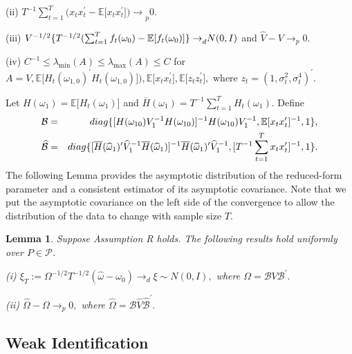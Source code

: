 \documentclass[11pt]{article}
\newtheorem{lemma}{Lemma}[section]
\begin{document}
\noindent (ii) $T^{-1}\sum_{t=1}^{T}(x_{t}x_{t}^{\prime }-\mathbb{E[}%
x_{t}x_{t}^{\prime }\mathbb{])\rightarrow }_{p}0.$

\noindent (iii) $V^{-1/2}\{T^{-1/2}(\sum_{t=1}^{T}f_{t}(\omega _{0})-\mathbb{%
E[}f_{t}(\omega _{0})\mathbb{]\} \rightarrow }_{d}N(0,I)$ and $\widehat{V}%
-V\rightarrow _{p}0.$

\noindent (iv) $C^{-1}\leq \lambda _{\min }(A)\leq \lambda _{\max }(A)\leq C$
for $A=V,\mathbb{E[}H_{t}\left( \omega _{1,0}\right) ^{\prime }H_{t}\left(
\omega _{1,0}\right) ]),\mathbb{E[}x_{t}x_{t}^{\prime }],\mathbb{E[}%
z_{t}z_{t}^{\prime }],$ where $z_{t}=(1,\sigma _{t}^{2},\sigma
_{t}^{4})^{\prime }.$

\smallskip

Let $H(\omega _{1})=\mathbb{E[}H_{t}(\omega _{1})]$ and $\overline{H}(\omega
_{1})=T^{-1}\sum_{t=1}^{T}H_{t}(\omega _{1}).$ Define%
\begin{eqnarray}
\mathcal{B} &=&diag\{[H(\omega _{10})V_{1}^{-1}H(\omega _{10})]^{-1}H(\omega
_{10})V_{1}^{-1},\mathbb{E[}x_{t}x_{t}^{\prime }]^{-1},1\},  \notag \\
\widehat{\mathcal{B}} &=&diag\{[\overline{H}(\widehat{\omega }_{1})^{\prime }%
\widehat{V}_{1}^{-1}\overline{H}(\widehat{\omega }_{1})]^{-1}\overline{H}(%
\widehat{\omega }_{1})^{\prime }\widehat{V}_{1}^{-1},[T^{-1}%
\sum_{t=1}^{T}x_{t}x_{t}^{\prime }]^{-1},1\}.  \label{Fhat}
\end{eqnarray}%
The following Lemma provides the asymptotic distribution of the reduced-form
parameter and a consistent estimator of its asymptotic covariance. Note that
we put the asymptotic covariance on the left side of the convergence to
allow the distribution of the data to change with sample size $T.$

\begin{lemma}
\label{Lemma Reduce}Suppose Assumption R holds. The following results hold
uniformly over $P\in \mathcal{P}$.

\noindent \emph{(i)} $\xi _{T}:=\Omega ^{-1/2}T^{-1/2}(\widehat{\omega }%
-\omega _{0})\rightarrow _{d}\xi \sim N(0,I),$ where $\Omega =\mathcal{B}V%
\mathcal{B}^{\prime }.$

\noindent \emph{(ii)} $\widehat{\Omega }-\Omega \rightarrow _{p}0,$ where $%
\widehat{\Omega }=\widehat{\mathcal{B}}\widehat{V}\widehat{\mathcal{B}}%
^{\prime }.$
\end{lemma}

\subsection{Weak Identification}
\end{document}
